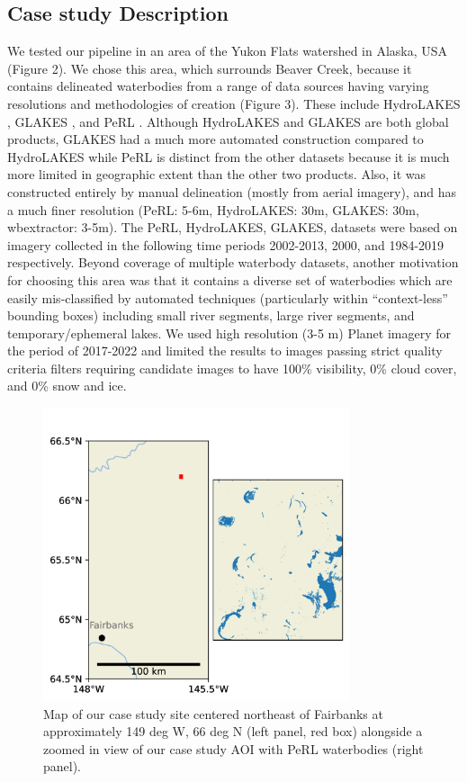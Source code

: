 \documentclass{article}
\begin{document}
\subsection{Case study Description}

We tested our pipeline in an area of the Yukon Flats watershed in Alaska, USA (Figure 2). We chose this area, which surrounds Beaver Creek, because it contains delineated waterbodies from a range of data sources having varying resolutions and methodologies of creation (Figure 3). These include HydroLAKES \citep{lehnerGlobalRiverHydrography2013}, GLAKES \citep{piMappingGlobalLake2022}, and PeRL \citep{musterPeRLCircumArcticPermafrost2017}. Although HydroLAKES and GLAKES are both global products, GLAKES had a much more automated construction compared to HydroLAKES while PeRL is distinct from the other datasets because it is much more limited in geographic extent than the other two products. Also, it was constructed entirely by manual delineation (mostly from aerial imagery), and has a much finer resolution (PeRL:  5-6m, HydroLAKES: 30m, GLAKES: 30m, wbextractor: 3-5m). The PeRL, HydroLAKES, GLAKES, datasets were based on imagery collected in the following time periods 2002-2013, 2000, and 1984-2019 respectively. Beyond coverage of multiple waterbody datasets, another motivation for choosing this area was that it contains a diverse set of waterbodies which are easily mis-classified by automated techniques (particularly within “context-less” bounding boxes) including small river segments, large river segments, and temporary/ephemeral lakes. We used high resolution (3-5 m) Planet imagery for the period of 2017-2022 and limited the results to images passing strict quality criteria filters requiring candidate images to have 100\% visibility, 0\% cloud cover, and 0\% snow and ice.

\begin{figure}
	\centering
	\includegraphics[width=9cm]{../figures/study_site}
	\caption{Map of our case study site centered northeast of Fairbanks at approximately 149 deg W, 66 deg N (left panel, red box) alongside a zoomed in view of our case study AOI with PeRL waterbodies (right panel).}
	\label{fig:study_site}
\end{figure}
\end{document}
